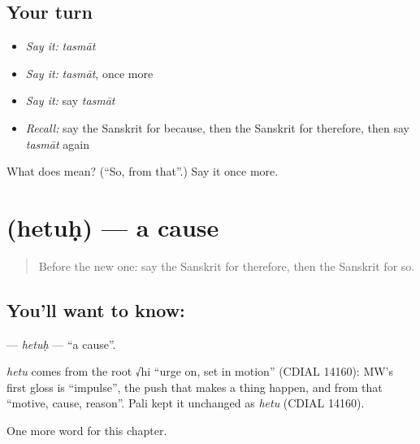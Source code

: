 \subsection*{Your turn}
\begin{itemize}
\raggedright
  \item \emph{Say it:} \emph{tasmāt}
  \item \emph{Say it:} \emph{tasmāt}, once more
  \item \emph{Say it:} say \emph{tasmāt}
  \item \emph{Recall:} say the Sanskrit for because, then the Sanskrit for therefore, then say \emph{tasmāt} again
\end{itemize}

\begin{tcolorbox}[breakable,colback=teal!4,colframe=teal!35!black,title={Before you move on}]
What does  mean? (\textquotedblleft{}So, from that\textquotedblright{}.) Say it once more.
\end{tcolorbox}
\section[\texorpdfstring{\sk{हेतुः} (hetuḥ)}{हेतुः (hetuḥ)}]{ (hetuḥ) — a cause}

\label{lesson:SA-C98-hetuh}



\begin{quote}
Before the new one: say the Sanskrit for therefore, then the Sanskrit for so.
\end{quote}

\subsection*{You'll want to know: }
\textbf{} — \emph{hetuḥ} — \textquotedblleft{}a cause\textquotedblright{}.

\begin{cousinweb}
\emph{hetu} comes from the root √hi \textquotedblleft{}urge on, set in motion\textquotedblright{} (CDIAL 14160): MW's first gloss is \textquotedblleft{}impulse\textquotedblright{}, the push that makes a thing happen, and from that \textquotedblleft{}motive, cause, reason\textquotedblright{}. Pali kept it unchanged as \emph{hetu} (CDIAL 14160).
\end{cousinweb}

\begin{grammarlens}[title={What you've built}]
One more word for this chapter.
\end{grammarlens}

